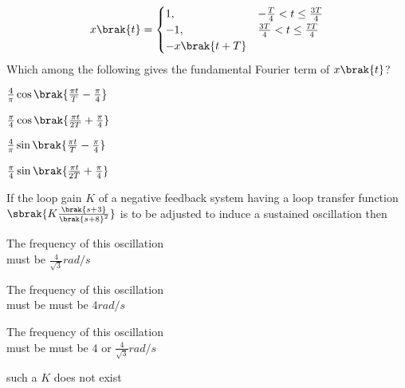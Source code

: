         \begin{align*}
            x\brak{t} = \begin{cases}
                1, & -\frac{T}{4} < t \leq \frac{3T}{4} \\
                -1, & \frac{3T}{4} < t \leq \frac{7T}{4} \\
                -x\brak{t+T}
            \end{cases}
        \end{align*}
        Which among the following gives the fundamental Fourier term of $x\brak{t}$?
        \begin{enumerate}
                \begin{multicols}{2}
                \item  $\frac{4}{\pi} \cos \brak{\frac{\pi t}{T}-\frac{\pi}{4}}$
                    \columnbreak
                \item  $\frac{\pi}{4}\cos\brak{\frac{\pi t}{2T}+\frac{\pi}{4}}$
                \end{multicols}
                \begin{multicols}{2}
                \item $\frac{4}{\pi}\sin \brak{\frac{\pi t}{T}-\frac{\pi}{4}}$ 
                    \columnbreak
                \item $\frac{\pi}{4}  \sin {\brak{\frac{\pi t}{2T}+\frac{\pi}{4}}}$
                \end{multicols}
        \end{enumerate}
    \item If the loop gain $K$ of a negative feedback system having a loop transfer function $\sbrak{K\frac{\brak{s+3}}{\brak{s+8}^{2}}}$ is to be adjusted to induce a sustained oscillation then
        \begin{enumerate}
                \begin{multicols}{2}
                \item The frequency of this oscillation \\must be
                    $\frac{4}{\sqrt{3}}rad/s$
                    \columnbreak
                \item The frequency of this oscillation \\must be must be $4 rad/s$
                \end{multicols}
                \begin{multicols}{2}
                \item The frequency of this oscillation \\must be must be $4$ or
                    $\frac{4}{\sqrt{3}}rad/s$
                    \columnbreak
                \item such a $K$ does not exist
                \end{multicols}
        \end{enumerate}
